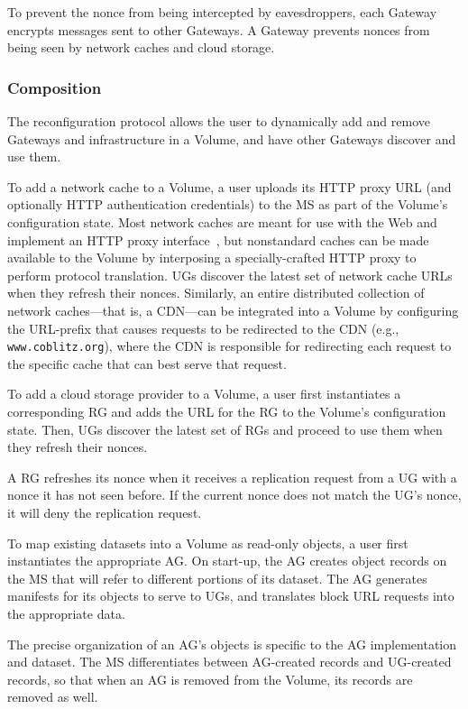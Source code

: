 To prevent the nonce from being intercepted by eavesdroppers, each Gateway encrypts messages sent to other Gateways. A Gateway prevents nonces from being seen by network caches and cloud storage.

\subsubsection{Composition}
\label{sec:composition}

The reconfiguration protocol allows the user to dynamically add and remove Gateways and infrastructure in a Volume, and have other Gateways discover and use them. 

To add a network cache to a Volume, a user uploads its HTTP proxy URL (and optionally HTTP authentication credentials) to the MS as part of the Volume's configuration state. Most network caches are meant for use with the Web and implement an HTTP proxy interface~\cite{HTTP-RFC}, but nonstandard caches can be made available to the Volume by interposing a specially-crafted HTTP proxy to perform protocol translation. UGs discover the latest set of network cache URLs when they refresh their nonces. Similarly, an entire distributed collection of network caches---that is, a CDN---can be integrated into a Volume by configuring the URL-prefix that causes requests to be redirected to the CDN (e.g., \texttt{www.coblitz.org}), where the CDN is responsible for redirecting each request to the specific cache that can best serve that request.

To add a cloud storage provider to a Volume, a user first instantiates a corresponding RG and adds the URL for the RG to the Volume's configuration state. Then, UGs discover the latest set of RGs and proceed to use them when they refresh their nonces.

A RG refreshes its nonce when it receives a replication request from a UG with a nonce it has not seen before. If the current nonce does not match the UG's nonce, it will deny the replication request.

To map existing datasets into a Volume as read-only objects, a user first instantiates the appropriate AG. On start-up, the AG creates object records on the MS that will refer to different portions of its dataset. The AG generates manifests for its objects to serve to UGs, and translates block URL requests into the appropriate data.

The precise organization of an AG's objects is specific to the AG implementation and dataset. The MS differentiates between AG-created records and UG-created records, so that when an AG is removed from the Volume, its records are removed as well.

